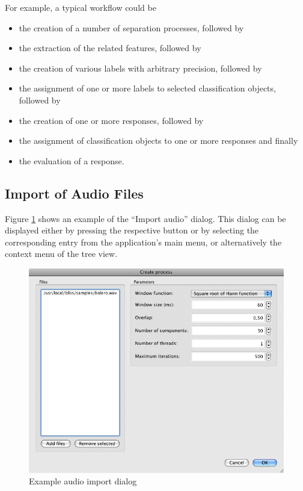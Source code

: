 For example, a typical workflow could be
\begin{itemize}
  \item   the creation of a number of separation processes, followed by
  \item   the extraction of the related features, followed by
  \item   the creation of various labels with arbitrary precision, followed by
  \item   the assignment of one or more labels to selected classification
    objects, followed by
  \item   the creation of one or more responses, followed by
  \item   the assignment of classification objects to one or more responses
    and finally
  \item   the evaluation of a response.
\end{itemize}


\subsection{Import of Audio Files}

Figure \ref{figure:ProcessCreation} shows an example of the ``Import audio''
dialog. This dialog can be displayed either by pressing the respective button or
by selecting the corresponding entry from the application's main menu, or
alternatively the context menu of the tree view.

\begin{figure}
    \includegraphics[width=\textwidth]{images/ProcessCreation.png}
    \caption{%
        \label{figure:ProcessCreation}%
        Example audio import dialog
    }
\end{figure}

